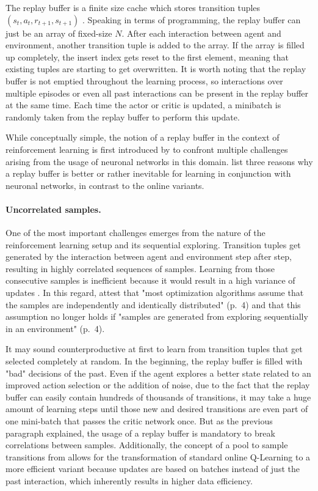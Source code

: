 The replay buffer is a finite size cache which stores transition tuples $(s_t, a_t, r_{t+1},s_{t+1})$ \cite[p.~4]{mnih2013playing}. Speaking in terms of programming, the replay buffer can just be an array of fixed-size $N$. After each interaction between agent and environment, another transition tuple is added to the array. If the array is filled up completely, the insert index gets reset to the first element, meaning that existing tuples are starting to get overwritten. It is worth noting that the replay buffer is not emptied throughout the learning process, so interactions over multiple episodes or even all past interactions can be present in the replay buffer at the same time. Each time the actor or critic is updated, a minibatch is randomly taken from the replay buffer to perform this update.
\par 
While conceptually simple, the notion of a replay buffer in the context of reinforcement learning is first introduced by \cite{lin1992reinforcement} to confront multiple challenges arising from the usage of neuronal networks in this domain. \cite{mnih2013playing} list three reasons why a replay buffer is better or rather inevitable for learning in conjunction with neuronal networks, in contrast to  the online variants.
\paragraph{Uncorrelated samples.} One of the most important  challenges emerges from the nature of the reinforcement learning setup and its sequential exploring.  Transition tuples get generated by the interaction between agent and environment step after step, resulting in highly correlated sequences of samples. Learning from those consecutive samples is inefficient because it would result in a high variance of updates \cite[p.~5]{mnih2013playing}. In this regard, \cite{lillicrap2019continuous} attest that "most optimization algorithms assume that the samples are independently and identically distributed" (p.~4) and that this assumption no longer holds if "samples are generated from exploring sequentially in an environment" (p.~4).
\par
It may sound counterproductive at first to learn from transition tuples that get selected completely at random. In the beginning, the replay buffer is filled with "bad" decisions of the past. Even if the agent explores a better state related to an improved action selection or the addition of noise, due to the fact that the replay buffer can easily contain hundreds of thousands of transitions, it may take a huge amount of learning steps until those new and desired transitions are even part of one mini-batch that passes the critic network once. But as the previous paragraph explained, the usage of a replay buffer is mandatory to break correlations between samples. Additionally, the concept of a pool to sample transitions from allows for the transformation of standard online Q-Learning to a more efficient variant because updates are based on batches instead of just the past interaction, which inherently results in higher data efficiency.

